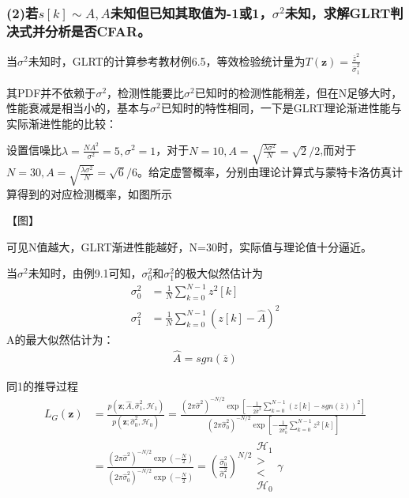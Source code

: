 \documentclass[fontset=windows]{article}
\numberwithin{figure}{section}
\begin{document}
\subsubsection*{(2)若\(s[k]\sim A,A\)未知但已知其取值为-1或1，\(\sigma^2\)未知，求解GLRT判决式并分析是否CFAR。}

当\(\sigma^2\)未知时，GLRT的计算参考教材例6.5，等效检验统计量为\(T(\mathbf{z})=\frac{\overline{z}^2}{\hat{\sigma}^2_1}\)

其PDF并不依赖于\(\sigma^2\)，检测性能要比\(\sigma^2\)已知时的检测性能稍差，但在N足够大时，性能衰减是相当小的，基本与\(\sigma^2\)已知时的特性相同，一下是GLRT理论渐进性能与实际渐进性能的比较：

设置信噪比\(\lambda=\frac{NA^2}{\sigma^2}=5,\sigma^2=1\)，对于\(N=10,A=\sqrt{\frac{\lambda\sigma^2}{N}}=\sqrt{2}/2\),而对于\(N=30,A=\sqrt{\frac{\lambda\sigma^2}{N}}=\sqrt{6}/6\)。给定虚警概率，分别由理论计算式与蒙特卡洛仿真计算得到的对应检测概率，如图所示

【图】

可见N值越大，GLRT渐进性能越好，N=30时，实际值与理论值十分逼近。

当\(\sigma^2\)未知时，由例9.1可知，\(\sigma^2_0\)和\(\sigma^2_1\)的极大似然估计为
\begin{align*}
	\sigma^2_0 & =\frac{1}{N}\sum_{k=0}^{N-1}z^2[k]           \\
	\sigma^2_1 & =\frac{1}{N}\sum_{k=0}^{N-1}(z[k]-\hat{A})^2
\end{align*}
A的最大似然估计为：
\begin{align*}
	\hat{A}=sgn(\overline{z})
\end{align*}

同1的推导过程
\begin{align*}
	L_G(\mathbf{z})
	 & =\frac{p(\mathbf{z};\hat{A},\hat{\sigma}^2_1,\mathcal{H}_1)}{p(\mathbf{z};\hat{\sigma}^2_0,\mathcal{H}_0)}
	=\frac{(2\pi \hat{\sigma}^2)^{-N/2}\exp\left[-\frac{1}{2\hat{\sigma}^2}\sum_{k=0}^{N-1}(z[k]-sgn(\overline{z}))^2\right]}
	{(2\pi \hat{\sigma}_0^2)^{-N/2}\exp\left[-\frac{1}{2\hat{\sigma}_0^2}\sum_{k=0}^{N-1}z^2[k]\right]}           \\
	 & =\frac{(2\pi \hat{\sigma}^2)^{-N/2}\exp\left(-\frac{N}{2}\right)}
	{(2\pi \hat{\sigma}_0^2)^{-N/2}\exp\left(-\frac{N}{2}\right)}=\left(\frac{\hat{\sigma}_0^2}{\hat{\sigma}_1^2}\right)^{N/2}
	\begin{matrix}
		\mathcal{H}_1 \\>\\<\\\mathcal{H_0}
	\end{matrix}\gamma
\end{align*}
\end{document}
